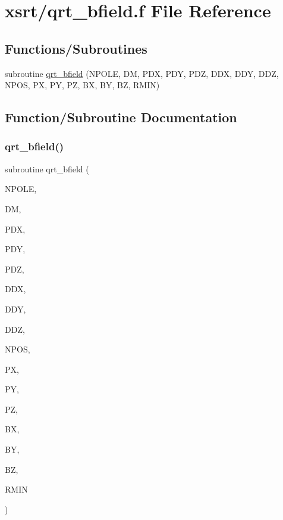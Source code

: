 \hypertarget{qrt__bfield_8f}{}\section{xsrt/qrt\+\_\+bfield.f File Reference}
\label{qrt__bfield_8f}
\subsection*{Functions/\+Subroutines}
\begin{DoxyCompactItemize}
\item 
subroutine \hyperlink{qrt__bfield_8f_a474bdc8487a2839cc84c62e8acdc33d1}{qrt\+\_\+bfield} (N\+P\+O\+LE, DM, P\+DX, P\+DY, P\+DZ, D\+DX, D\+DY, D\+DZ, N\+P\+OS, PX, PY, PZ, BX, BY, BZ, R\+M\+IN)
\end{DoxyCompactItemize}


\subsection{Function/\+Subroutine Documentation}
\mbox{\label{qrt__bfield_8f_a474bdc8487a2839cc84c62e8acdc33d1}} 
\subsubsection{\texorpdfstring{qrt\+\_\+bfield()}{qrt\_bfield()}}
{\footnotesize\ttfamily subroutine qrt\+\_\+bfield (\begin{DoxyParamCaption}\item[{integer}]{N\+P\+O\+LE,  }\item[{double precision, dimension(npole)}]{DM,  }\item[{double precision, dimension(npole)}]{P\+DX,  }\item[{double precision, dimension(npole)}]{P\+DY,  }\item[{double precision, dimension(npole)}]{P\+DZ,  }\item[{double precision, dimension(npole)}]{D\+DX,  }\item[{double precision, dimension(npole)}]{D\+DY,  }\item[{double precision, dimension(npole)}]{D\+DZ,  }\item[{integer}]{N\+P\+OS,  }\item[{double precision, dimension(npos)}]{PX,  }\item[{double precision, dimension(npos)}]{PY,  }\item[{double precision, dimension(npos)}]{PZ,  }\item[{double precision, dimension(npos)}]{BX,  }\item[{double precision, dimension(npos)}]{BY,  }\item[{double precision, dimension(npos)}]{BZ,  }\item[{double precision}]{R\+M\+IN }\end{DoxyParamCaption})}

